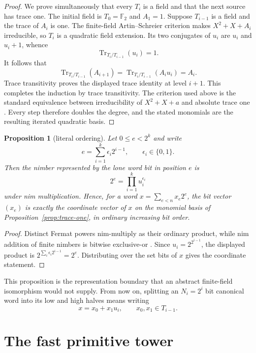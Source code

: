 \documentclass[11pt]{article}
\newtheorem{proposition}[theorem]{Proposition}
\theoremstyle{definition}
\theoremstyle{remark}
\newcommand{\F}{\mathbb F}
\newcommand{\Tr}{\operatorname{Tr}}
\begin{document}
\begin{proof}
We prove simultaneously that every $T_i$ is a field and that the next source
has trace one.  The initial field is $T_0=\F_2$ and $A_1=1$.  Suppose
$T_{i-1}$ is a field and the trace of $A_i$ is one.  The finite-field
Artin--Schreier criterion makes $X^2+X+A_i$ irreducible, so $T_i$ is a
quadratic field extension.  Its two conjugates of $u_i$ are $u_i$ and
$u_i+1$, whence
\[
  \Tr_{T_i/T_{i-1}}(u_i)=1.
\]
It follows that
\[
  \Tr_{T_i/T_{i-1}}(A_{i+1})
  =\Tr_{T_i/T_{i-1}}(A_i u_i)=A_i.
\]
Trace transitivity proves the displayed trace identity at level $i+1$.
This completes the induction by trace transitivity.  The criterion used above
is the standard equivalence between irreducibility of $X^2+X+a$ and absolute
trace one \cite{lidlniederreiter1997}.  Every step therefore doubles the
degree, and the stated monomials are the resulting iterated quadratic basis.
\end{proof}

\begin{proposition}[literal ordering]\label{prop:literal-order}
Let $0\leq e<2^k$ and write
\[
  e=\sum_{i=1}^k \epsilon_i2^{i-1},
  \qquad \epsilon_i\in\{0,1\}.
\]
Then the nimber represented by the lone word bit in position $e$ is
\[
  2^e=\prod_{i=1}^k u_i^{\epsilon_i}
\]
under nim multiplication.  Hence, for a word
$x=\sum_{e<n}x_e2^e$, the bit vector $(x_e)$ is exactly the coordinate
vector of $x$ on the monomial basis of Proposition~\ref{prop:trace-one}, in
ordinary increasing bit order.
\end{proposition}

\begin{proof}
Distinct Fermat powers nim-multiply as their ordinary product, while nim
addition of finite nimbers is bitwise exclusive-or
\cite{conway1976,lenstra1978}.  Since $u_i=2^{2^{i-1}}$, the displayed
product is $2^{\sum_i\epsilon_i2^{i-1}}=2^e$.  Distributing over the set
bits of $x$ gives the coordinate statement.
\end{proof}

This proposition is the representation boundary that an abstract
finite-field isomorphism would not supply.  From now on, splitting an
$N_i=2^i$ bit canonical word into its low and high halves means writing
\begin{equation}
  x=x_0+x_1u_i,
  \qquad x_0,x_1\in T_{i-1}.
\end{equation}

\section{The fast primitive tower}
\end{document}
